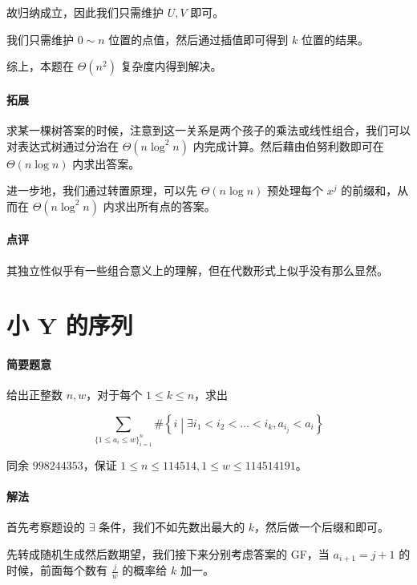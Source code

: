 \documentclass[12pt]{ctexart}
\theoremstyle{theorem}
\theoremstyle{theorem}
\begin{document}
故归纳成立，因此我们只需维护 $U,V$ 即可。

我们只需维护 $0\sim n$ 位置的点值，然后通过插值即可得到 $k$ 位置的结果。

综上，本题在 $\Theta(n^2)$ 复杂度内得到解决。

\paragraph{拓展} 求某一棵树答案的时候，注意到这一关系是两个孩子的乘法或线性组合，我们可以对表达式树通过分治在 $\Theta(n\log ^2 n)$ 内完成计算。然后藉由伯努利数即可在 $\Theta(n\log n)$ 内求出答案。

进一步地，我们通过转置原理，可以先 $\Theta(n\log n)$ 预处理每个 $x^j$ 的前缀和，从而在 $\Theta(n\log^2n)$ 内求出所有点的答案。

\paragraph{点评} 其独立性似乎有一些组合意义上的理解，但在代数形式上似乎没有那么显然。

\newpage

\section{小 Y 的序列}

\paragraph{简要题意}

给出正整数 $n, w$，对于每个 $1\le k\le n$，求出

$$
\sum_{\{1\le a_i\le w\}_{i=1}^n} \# \left\{
i \middle \vert \exists i_1<i_2<\dots <i_k, a_{i_j} < a_i
\right \}
$$

同余 $998244353$，保证 $1\le n\le 114514, 1\le w\le 114514191$。

\paragraph{解法}

首先考察题设的 $\exists$ 条件，我们不如先数出最大的 $k$，然后做一个后缀和即可。

先转成随机生成然后数期望，我们接下来分别考虑答案的 GF，当 $a_{i+1}=j+1$ 的时候，前面每个数有 $\frac jw$ 的概率给 $k$ 加一。
\end{document}
